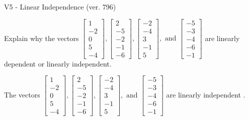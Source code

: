 \begin{exercise}
  \begin{exerciseTitle}V5 - Linear Independence (ver. 796)\end{exerciseTitle}
  \begin{exerciseStatement}
    Explain why the vectors \(\left[\begin{array}{r}
1 \\
-2 \\
0 \\
5 \\
-4
\end{array}\right] , \left[\begin{array}{r}
2 \\
-5 \\
-2 \\
-1 \\
-6
\end{array}\right] , \left[\begin{array}{r}
-2 \\
-4 \\
3 \\
-1 \\
5
\end{array}\right] , \text{ and } \left[\begin{array}{r}
-5 \\
-3 \\
-4 \\
-6 \\
-1
\end{array}\right]\) are linearly dependent or linearly independent.	


  \end{exerciseStatement}
  \begin{exerciseAnswer}
   The vectors \(\left[\begin{array}{r}
1 \\
-2 \\
0 \\
5 \\
-4
\end{array}\right] , \left[\begin{array}{r}
2 \\
-5 \\
-2 \\
-1 \\
-6
\end{array}\right] , \left[\begin{array}{r}
-2 \\
-4 \\
3 \\
-1 \\
5
\end{array}\right] , \text{ and } \left[\begin{array}{r}
-5 \\
-3 \\
-4 \\
-6 \\
-1
\end{array}\right]\) are 
  	 linearly independent  .
  


  \end{exerciseAnswer}
\end{exercise}